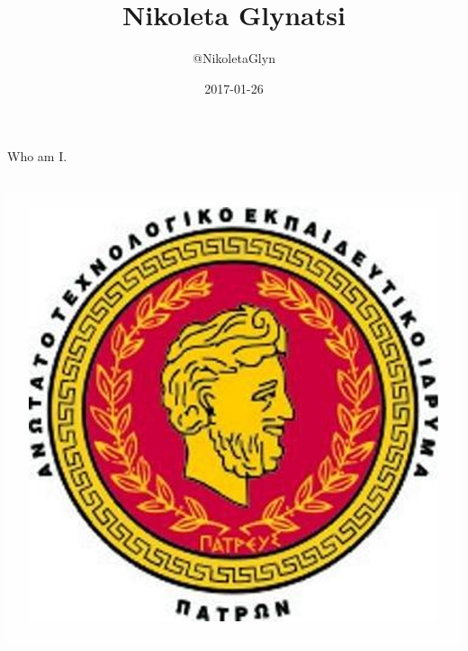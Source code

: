 \documentclass{beamer}
\title{Nikoleta Glynatsi}
\author{@NikoletaGlyn}
\date{2017-01-26}
\begin{document}
\frame{\titlepage}

\begin{frame}{Who am I.}
\begin{columns}[T] %
\begin{column}{.2\textwidth}
  		\includegraphics[width=\textwidth]{static/tei-patras-logo.jpg}


\end{column}
\end{columns}
\end{frame}
\end{document}
